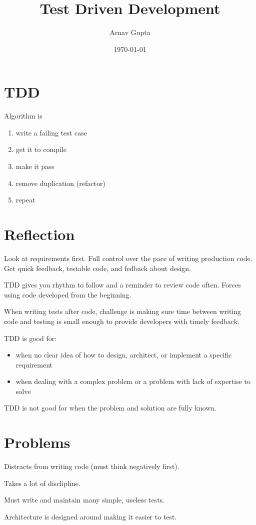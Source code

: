 \documentclass[11pt]{article}
\author{Arnav Gupta}
\date{\today}
\title{Test Driven Development}
\begin{document}
\maketitle
\tableofcontents

\section{TDD}
\label{sec:org945d63a}
Algorithm is
\begin{enumerate}
\item write a failing test case
\item get it to compile
\item make it pass
\item remove duplication (refactor)
\item repeat
\end{enumerate}
\section{Reflection}
\label{sec:org90d1d55}
Look at requirements first.
Full control over the pace of writing production code.
Get quick feedback, testable code, and fedback about design.

TDD gives you rhythm to follow and a reminder to review code often.
Forces using code developed from the beginning.

When writing tests after code, challenge is making sure time between writing code and testing is
small enough to provide developers with timely feedback.

TDD is good for:
\begin{itemize}
\item when no clear idea of how to design, architect, or implement a specific requirement
\item when dealing with a complex problem or a problem with lack of expertise to solve
\end{itemize}

TDD is not good for when the problem and solution are fully known.
\section{Problems}
\label{sec:orgf897432}
Distracts from writing code (must think negatively first).

Takes a lot of disclipline.

Must write and maintain many simple, useless tests.

Architecture is designed around making it easier to test.
\end{document}
